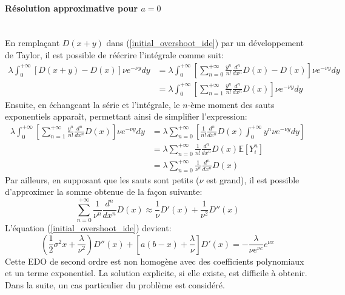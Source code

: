 \paragraph{Résolution approximative pour $a=0$}\phantom{}\\
En remplaçant $D(x+y)$ dans (\ref{initial_overshoot_ide}) par un développement de Taylor, il est possible de réécrire l'intégrale comme suit:
\[
\begin{aligned}
    \lambda\int_0^{+\infty}\left[D(x+y)-D(x)\right]\nu e^{-\nu y}dy&=\lambda\int_0^{+\infty}\left[\sum_{n=0}^{+\infty}\frac{y^n}{n!}\frac{d^n}{dx^n}D(x)-D(x)\right]\nu e^{-\nu y}dy\\
    &=\lambda\int_0^{+\infty}\left[\sum_{n=1}^{+\infty}\frac{y^n}{n!}\frac{d^n}{dx^n}D(x)\right]\nu e^{-\nu y}dy
\end{aligned}
\]
Ensuite, en échangeant la série et l'intégrale, le $n$-ème moment des sauts exponentiels apparaît, permettant ainsi de simplifier l'expression:
\[
\begin{aligned}
    \lambda\int_0^{+\infty}\left[\sum_{n=1}^{+\infty}\frac{y^n}{n!}\frac{d^n}{dx^n}D(x)\right]\nu e^{-\nu y}dy&=\lambda\sum_{n=0}^{+\infty}\left[\frac{1}{n!}\frac{d^n}{dx^n}D(x)\int_0^{+\infty}y^n\nu e^{-\nu y}dy\right]\\
    &=\lambda\sum_{n=0}^{+\infty}\frac{1}{n!}\frac{d^n}{dx^n}D(x)\mathds{E}\left[Y_i^n\right]\\
    &=\lambda\sum_{n=0}^{+\infty}\frac{1}{\nu^n}\frac{d^n}{dx^n}D(x)
\end{aligned}
\]
Par ailleurs, en supposant que les sauts sont petits ($\nu$ est grand), il est possible d'approximer la somme obtenue de la façon suivante:
\[
\sum_{n=0}^{+\infty}\frac{1}{\nu^n}\frac{d^n}{dx^n}D(x)\approx\frac{1}{\nu}D'(x)+\frac{1}{\nu^2}D''(x)
\]
L'équation (\ref{initial_overshoot_ide}) devient:
\begin{equation}\label{final_overshoot_ode}
    \left(\frac{1}{2}\sigma^2x+\frac{\lambda}{\nu^2}\right)D''(x)+\left[a(b-x)+\frac{\lambda}{\nu}\right]D'(x) =-\frac{\lambda}{\nu e^{\nu c}}e^{\nu x}
\end{equation}
Cette \acs{EDO} de second ordre est non homogène avec des coefficients polynomiaux et un terme exponentiel. La solution explicite, si elle existe, est difficile à obtenir. Dans la suite, un cas particulier du problème est considéré.

